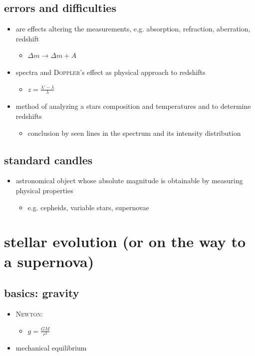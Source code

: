 \documentclass[a4paper, 11pt]{article}
\begin{document}
    \subsection{errors and difficulties}
      \begin{itemize}
        \item are effects altering the measurements, e.g. absorption, refraction, aberration, redshift
        \begin{itemize}
          \item $\Delta m\to\Delta m+A$
        \end{itemize}
        \item spectra and \textsc{Doppler}'s effect as physical approach to redshifts
        \begin{itemize}
          \item $z=\frac{\lambda'-\lambda}{\lambda}$
        \end{itemize}
        \item method of analyzing a stars composition and temperatures and to determine redshifts
        \begin{itemize}
          \item conclusion by seen lines in the spectrum and its intensity distribution
        \end{itemize}
      \end{itemize}
    \subsection{standard candles}
      \begin{itemize}
        \item astronomical object whose absolute magnitude is obtainable by measuring physical properties
        \begin{itemize}
          \item e.g. cepheids, variable stars, supernovae
        \end{itemize}
      \end{itemize}
  \section{stellar evolution (or on the way to a supernova)}
    \subsection{basics: gravity}
      \begin{itemize}
        \item \textsc{Newton}:
        \begin{itemize}
          \item $g=\frac{GM}{r^2}$
        \end{itemize}
        \item mechanical equilibrium
      \end{itemize}
\end{document}
